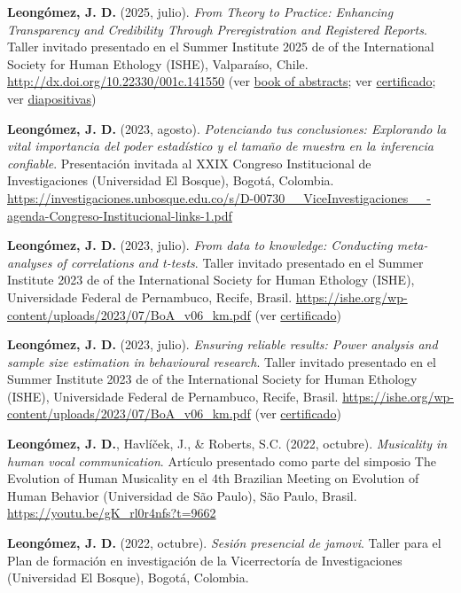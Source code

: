 \documentclass[11pt,a4paper,]{awesome-cv}
\begin{document}
\textbf{Leongómez, J. D.} (2025, julio). \emph{From Theory to Practice:
Enhancing Transparency and Credibility Through Preregistration and
Registered Reports}. Taller invitado presentado en el Summer Institute
2025 de of the International Society for Human Ethology (ISHE),
Valparaíso, Chile. \url{http://dx.doi.org/10.22330/001c.141550} (ver
\href{https://ishe.org/wp-content/uploads/2025/07/BoA_2025.pdf}{book of
abstracts}; ver
\href{https://jdleongomez.info/es/files/Cert_ISHE_2025.pdf}{certificado};
ver
\href{https://jdleongomez.github.io/preregistration-and-RRs/}{diapositivas})

\textbf{Leongómez, J. D.} (2023, agosto). \emph{Potenciando tus
conclusiones: Explorando la vital importancia del poder estadístico y el
tamaño de muestra en la inferencia confiable}. Presentación invitada al
XXIX Congreso Institucional de Investigaciones (Universidad El Bosque),
Bogotá, Colombia.
\url{https://investigaciones.unbosque.edu.co/s/D-00730__ViceInvestigaciones__-agenda-Congreso-Institucional-links-1.pdf}

\textbf{Leongómez, J. D.} (2023, julio). \emph{From data to knowledge:
Conducting meta-analyses of correlations and t-tests}. Taller invitado
presentado en el Summer Institute 2023 de of the International Society
for Human Ethology (ISHE), Universidade Federal de Pernambuco, Recife,
Brasil. \url{https://ishe.org/wp-content/uploads/2023/07/BoA_v06_km.pdf}
(ver
\href{https://jdleongomez.info/es/files/Cert_ISHE_2023.pdf}{certificado})

\textbf{Leongómez, J. D.} (2023, julio). \emph{Ensuring reliable
results: Power analysis and sample size estimation in behavioural
research}. Taller invitado presentado en el Summer Institute 2023 de of
the International Society for Human Ethology (ISHE), Universidade
Federal de Pernambuco, Recife, Brasil.
\url{https://ishe.org/wp-content/uploads/2023/07/BoA_v06_km.pdf} (ver
\href{https://jdleongomez.info/es/files/Cert_ISHE_2023.pdf}{certificado})

\textbf{Leongómez, J. D.}, Havlíček, J., \& Roberts, S.C. (2022,
octubre). \emph{Musicality in human vocal communication}. Artículo
presentado como parte del simposio The Evolution of Human Musicality en
el 4th Brazilian Meeting on Evolution of Human Behavior (Universidad de
São Paulo), São Paulo, Brasil. \url{https://youtu.be/gK_rl0r4nfs?t=9662}

\textbf{Leongómez, J. D.} (2022, octubre). \emph{Sesión presencial de
jamovi}. Taller para el Plan de formación en investigación de la
Vicerrectoría de Investigaciones (Universidad El Bosque), Bogotá,
Colombia.
\end{document}
